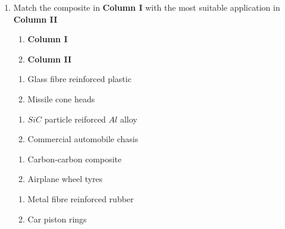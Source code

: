 \documentclass[journal,12pt,onecolumn]{IEEEtran}
\theoremstyle{remark}
\begin{document}
\begin{enumerate}
        \hfill{}



    \item Match the composite in \textbf{Column I} with the most suitable application in 
        \textbf{Column II}
        \begin{multicols}{2}
            \begin{enumerate}
                \item[] \textbf{Column I} \columnbreak
                \item[] \textbf{Column II}
            \end{enumerate}
        \end{multicols}

        \begin{multicols}{2}
            \begin{enumerate}
                \item[P.] Glass fibre reinforced plastic \columnbreak
                \item[1.] Missile cone heads
            \end{enumerate}

        \end{multicols}
        \begin{multicols}{2}
            \begin{enumerate}
                \item[Q.] $SiC$ particle reiforced $Al$ alloy \columnbreak
                \item[2.] Commercial automobile chasis
            \end{enumerate}

        \end{multicols}
        \begin{multicols}{2}
            \begin{enumerate}
                \item[R.]  Carbon-carbon composite \columnbreak
                \item[3.] Airplane wheel tyres
            \end{enumerate}

        \end{multicols}
        \begin{multicols}{2}
            \begin{enumerate}
                \item[S.] Metal fibre reinforced rubber\columnbreak
                \item[4.]  Car piston rings 
            \end{enumerate}


\end{multicols}
\end{enumerate}
\end{document}
